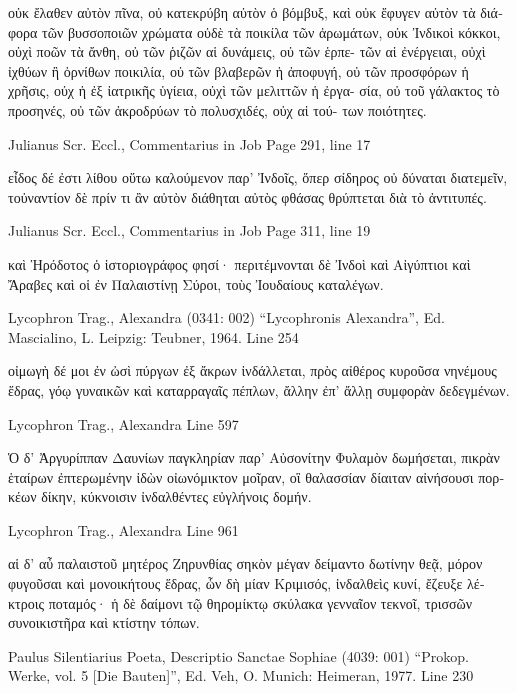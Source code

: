 \documentclass[12pt,letterpaper,twoside,final]{memoir}
\begin{document}
\begin{greek}
                     οὐκ ἔλαθεν αὐτὸν πῖνα, οὐ κατεκρύβη αὐτὸν ὁ βόμβυξ, καὶ οὐκ 
ἔφυγεν αὐτὸν τὰ διάφορα τῶν βυσσοποιῶν χρώματα οὐδὲ τὰ ποικίλα τῶν ἀρωμάτων, 
οὐκ Ἰνδικοὶ κόκκοι, οὐχὶ ποῶν τὰ ἄνθη, οὐ τῶν ῥιζῶν αἱ δυνάμεις, οὐ τῶν ἑρπε-
τῶν αἱ ἐνέργειαι, οὐχὶ ἰχθύων ἢ ὀρνίθων ποικιλία, οὐ τῶν βλαβερῶν ἡ ἀποφυγή, 
οὐ τῶν προσφόρων ἡ χρῆσις, οὐχ ἡ ἐξ ἰατρικῆς ὑγίεια, οὐχὶ τῶν μελιττῶν ἡ ἐργα-
σία, οὐ τοῦ γάλακτος τὸ προσηνές, οὐ τῶν ἀκροδρύων τὸ πολυσχιδές, οὐχ αἱ τού-
των ποιότητες. 



Julianus Scr. Eccl., Commentarius in Job 
Page 291, line 17

εἶδος δέ ἐστι λίθου οὕτω καλούμενον παρ' Ἰνδοῖς, ὅπερ σίδηρος οὐ δύναται 
διατεμεῖν, τοὐναντίον δὲ πρίν τι ἂν αὐτὸν διάθηται αὐτὸς φθάσας θρύπτεται διὰ 
τὸ ἀντιτυπές. 



Julianus Scr. Eccl., Commentarius in Job 
Page 311, line 19

               καὶ Ἡρόδοτος ὁ ἱστοριογράφος φησί· περιτέμνονται δὲ Ἰνδοὶ καὶ   
Αἰγύπτιοι καὶ Ἄραβες καὶ οἱ ἐν Παλαιστίνῃ Σύροι, τοὺς Ἰουδαίους καταλέγων. 



Lycophron Trag., Alexandra (0341: 002)
“Lycophronis Alexandra”, Ed. Mascialino, L.
Leipzig: Teubner, 1964.
Line 254

                          οἰμωγὴ δέ μοι 
ἐν ὠσὶ πύργων ἐξ ἄκρων ἰνδάλλεται, 
πρὸς αἰθέρος κυροῦσα νηνέμους ἕδρας, 
γόῳ γυναικῶν καὶ καταρραγαῖς πέπλων, 
ἄλλην ἐπ' ἄλλῃ συμφορὰν δεδεγμένων. 



Lycophron Trag., Alexandra 
Line 597

Ὁ δ' Ἀργυρίππαν Δαυνίων παγκληρίαν 
παρ' Αὐσονίτην Φυλαμὸν δωμήσεται,   
πικρὰν ἑταίρων ἐπτερωμένην ἰδὼν 
οἰωνόμικτον μοῖραν, οἳ θαλασσίαν 
δίαιταν αἰνήσουσι πορκέων δίκην, 
κύκνοισιν ἰνδαλθέντες εὐγλήνοις δομήν. 



Lycophron Trag., Alexandra 
Line 961

αἱ δ' αὖ παλαιστοῦ μητέρος Ζηρυνθίας 
σηκὸν μέγαν δείμαντο δωτίνην θεᾷ, 
μόρον φυγοῦσαι καὶ μονοικήτους ἕδρας, 
ὧν δὴ μίαν Κριμισός, ἰνδαλθεὶς κυνί, 
ἔζευξε λέκτροις ποταμός· ἡ δὲ δαίμονι 
τῷ θηρομίκτῳ σκύλακα γενναῖον τεκνοῖ, 
τρισσῶν συνοικιστῆρα καὶ κτίστην τόπων. 



Paulus Silentiarius Poeta, Descriptio Sanctae Sophiae (4039: 001)
“Prokop. Werke, vol. 5 [Die Bauten]”, Ed. Veh, O.
Munich: Heimeran, 1977.
Line 230


\end{greek}
\end{document}
